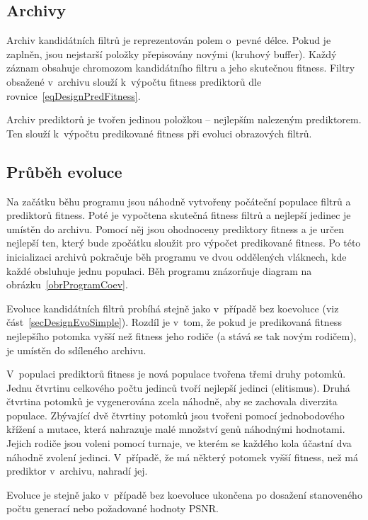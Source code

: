 \subsection{Archivy}

Archiv kandidátních filtrů je reprezentován polem o~pevné délce. Pokud je zaplněn, jsou nejstarší položky přepisovány novými (kruhový buffer). Každý záznam obsahuje chromozom kandidátního filtru a jeho skutečnou fitness. Filtry obsažené v~archivu slouží k~výpočtu fitness prediktorů dle rovnice~\ref{eqDesignPredFitness}.

Archiv prediktorů je tvořen jedinou položkou -- nejlepším nalezeným prediktorem. Ten slouží k~výpočtu predikované fitness při evoluci obrazových filtrů.

\subsection{Průběh evoluce}

Na začátku běhu programu jsou náhodně vytvořeny počáteční populace filtrů a prediktorů fitness. Poté je vypočtena skutečná fitness filtrů a nejlepší jedinec je umístěn do archivu. Pomocí něj jsou ohodnoceny prediktory fitness a je určen nejlepší ten, který bude zpočátku sloužit pro výpočet predikované fitness. Po této inicializaci archivů pokračuje běh programu ve dvou oddělených vláknech, kde každé obsluhuje jednu populaci. Běh programu znázorňuje diagram na obrázku~\ref{obrProgramCoev}.

Evoluce kandidátních filtrů probíhá stejně jako v~případě bez koevoluce (viz část~\ref{secDesignEvoSimple}). Rozdíl je v~tom, že pokud je predikovaná fitness nejlepšího potomka vyšší než fitness jeho rodiče (a stává se tak novým rodičem), je umístěn do sdíleného archivu.

V~populaci prediktorů fitness je nová populace tvořena třemi druhy potomků. Jednu čtvrtinu celkového počtu jedinců tvoří nejlepší jedinci (elitismus). Druhá čtvrtina potomků je vygenerována zcela náhodně, aby se zachovala diverzita populace. Zbývající dvě čtvrtiny potomků jsou tvořeni pomocí jednobodového křížení a mutace, která nahrazuje malé množství genů náhodnými hodnotami. Jejich rodiče jsou voleni pomocí turnaje, ve kterém se každého kola účastní dva náhodně zvolení jedinci. V~případě, že má některý potomek vyšší fitness, než má prediktor v~archivu, nahradí jej.

Evoluce je stejně jako v~případě bez koevoluce ukončena po dosažení stanoveného počtu generací nebo požadované hodnoty PSNR.

